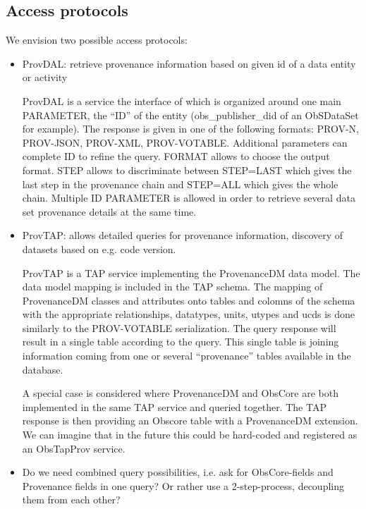 \subsection{Access protocols}
\label{AccessPro}
We envision two possible access protocols:
\begin{itemize}
\item ProvDAL: retrieve provenance information based on given id of a data entity or activity

ProvDAL is a service the interface of which is organized around one main PARAMETER, the ``ID'' of the entity (obs\_publisher\_did of an ObSDataSet for example). The response is given in one of the following formats: PROV-N, PROV-JSON, PROV-XML, PROV-VOTABLE. Additional parameters can complete ID to refine the query. FORMAT allows to choose the output format. STEP allows to discriminate between STEP=LAST which gives the last step in the provenance chain and STEP=ALL which gives the whole chain.
Multiple ID PARAMETER is allowed in order to retrieve several data set provenance details at the same time.
\item ProvTAP: allows detailed queries for provenance information, discovery of datasets based on 
e.g. code version.

ProvTAP is a TAP service implementing the ProvenanceDM data model. The data model mapping is included in the TAP schema. The mapping of ProvenanceDM classes and attributes onto tables and colomns of the schema with the appropriate relationships, datatypes, units, utypes and ucds is done similarly to the PROV-VOTABLE serialization. The query response will result in a single table according to the query.
 This  single table is joining information coming from one or several ``provenance'' tables available in the database. 

A special case is considered where ProvenanceDM and ObsCore are both implemented in the same TAP service and queried together. The TAP response is then providing an Obscore table with a ProvenanceDM extension. We can imagine that in the future this could be hard-coded and registered as an ObsTapProv service. 


\item Do we need combined query possibilities, i.e. ask for ObsCore-fields and Provenance fields
in one query? Or rather use a 2-step-process, decoupling them from each other?
\end{itemize}


